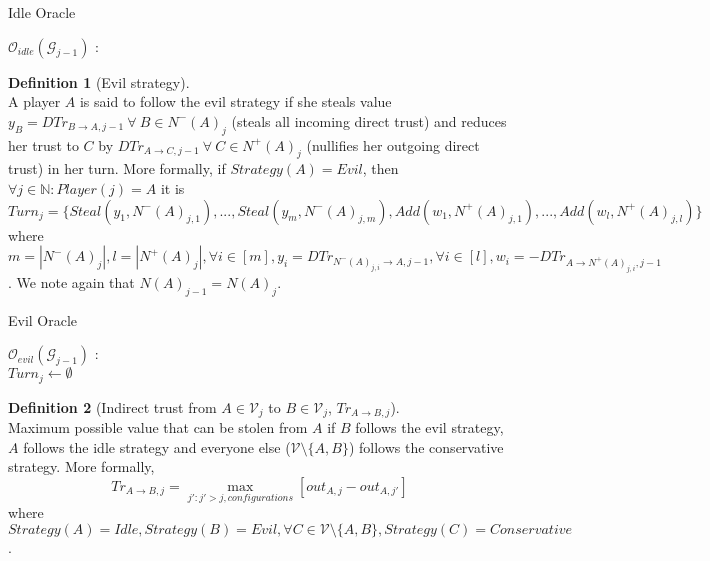 \documentclass[11pt]{article}
\theoremstyle{definition}
\newtheorem{definition}{Definition}[section]
\theoremstyle{corollary}
\theoremstyle{lemma}
\begin{document}
     \begin{algorithm}[H]
        \label{idleoracle}
        \caption{Idle Oracle}
        $\mathcal{O}_{idle}(\mathcal{G}_{j-1})$ : \\ {
           \Return{$\emptyset$}}
     \end{algorithm}
     \begin{definition}[Evil strategy] \ \\
        A player $A$ is said to follow the evil strategy if she steals value $y_B = DTr_{B \rightarrow A, j-1} \:
        \forall \: B \in N^{-}(A)_j$ (steals all incoming direct trust) and reduces her trust to $C$ by
        $DTr_{A \rightarrow C, j-1} \: \forall \: C \in N^{+}(A)_j$ (nullifies her outgoing direct trust) in her turn.
        More formally, if $Strategy(A) = Evil$, then $\forall j \in \mathbb{N} : Player(j) = A$ it is $Turn_j =
        \{Steal(y_1,N^{-}(A)_{j,1}),...,Steal(y_m,N^{-}(A)_{j,m}), Add(w_1,N^{+}(A)_{j,1}),...,Add(w_l,N^{+}(A)_{j,l})\}$ 
        where $m = |N^{-}(A)_j|, l = |N^{+}(A)_j|, \forall i \in [m], y_i = DTr_{N^{-}(A)_{j,i} \rightarrow A, j-1},
        \forall i \in [l], w_i = -DTr_{A \rightarrow N^{+}(A)_{j,i},j-1}$. We note again that $N(A)_{j-1} = N(A)_j$.
     \end{definition}
     \begin{algorithm}[H]
        \label{eviloracle}
        \caption{Evil Oracle}
        $\mathcal{O}_{evil}(\mathcal{G}_{j-1})$ : \\ {
           $Turn_j \gets \emptyset$ \\
           }
     \end{algorithm}
     \begin{definition}[Indirect trust from $A \in \mathcal{V}_j$ to $B \in \mathcal{V}_j$, $Tr_{A \rightarrow B, j}$] \ \\
        Maximum possible value that can be stolen from $A$ if $B$ follows the evil strategy, $A$ follows the idle strategy
        and everyone else ($\mathcal{V} \setminus \{A,B\}$) follows the conservative strategy. More formally,
        $$Tr_{A \rightarrow B, j} = \max\limits_{j' : j' > j, configurations}{[out_{A,j} - out_{A,j'}]}$$ where
        $Strategy(A) = Idle, Strategy(B) = Evil, \forall C \in \mathcal{V} \setminus \{A,B\}, Strategy(C) = Conservative$.
     \end{definition}
\end{document}
